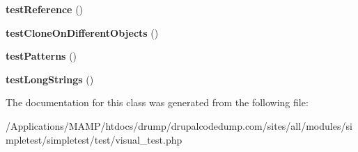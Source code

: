 \begin{DoxyCompactItemize}
\item 
\hypertarget{class_failing_unit_test_case_output_a61fd57dcc06f1468170ad8c6492a5cff}{
{\bfseries testReference} ()}
\label{class_failing_unit_test_case_output_a61fd57dcc06f1468170ad8c6492a5cff}

\item 
\hypertarget{class_failing_unit_test_case_output_adae5b4b574124374fb12959a5f516f9f}{
{\bfseries testCloneOnDifferentObjects} ()}
\label{class_failing_unit_test_case_output_adae5b4b574124374fb12959a5f516f9f}

\item 
\hypertarget{class_failing_unit_test_case_output_a4a29ffbd6b28d8a8ba11be4140a681ce}{
{\bfseries testPatterns} ()}
\label{class_failing_unit_test_case_output_a4a29ffbd6b28d8a8ba11be4140a681ce}

\item 
\hypertarget{class_failing_unit_test_case_output_a2ad40badc25223d3c3b64af2bf7690f6}{
{\bfseries testLongStrings} ()}
\label{class_failing_unit_test_case_output_a2ad40badc25223d3c3b64af2bf7690f6}

\end{DoxyCompactItemize}


The documentation for this class was generated from the following file:\begin{DoxyCompactItemize}
\item 
/Applications/MAMP/htdocs/drump/drupalcodedump.com/sites/all/modules/simpletest/simpletest/test/visual\_\-test.php\end{DoxyCompactItemize}
